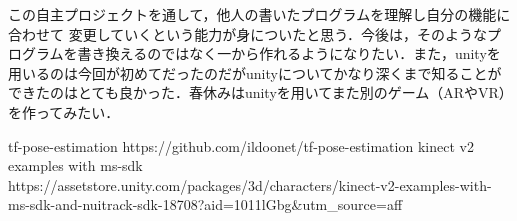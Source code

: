 \documentclass[uplatex,titlepage]{jsarticle}
\begin{document}
この自主プロジェクトを通して，他人の書いたプログラムを理解し自分の機能に合わせて
変更していくという能力が身についたと思う．今後は，そのようなプログラムを書き換えるのではなく一から作れるようになりたい．また，unityを用いるのは今回が初めてだったのだがunityについてかなり深くまで知ることができたのはとても良かった．春休みはunityを用いてまた別のゲーム（ARやVR）を作ってみたい．

\begin{thebibliography}{9}
 tf-pose-estimation https://github.com/ildoonet/tf-pose-estimation
 kinect v2 examples with ms-sdk  https://assetstore.unity.com/packages/3d/characters/kinect-v2-examples-with-ms-sdk-and-nuitrack-sdk-18708?aid=1011lGbg\&utm\_source=aff
\end{thebibliography}
\end{document}
